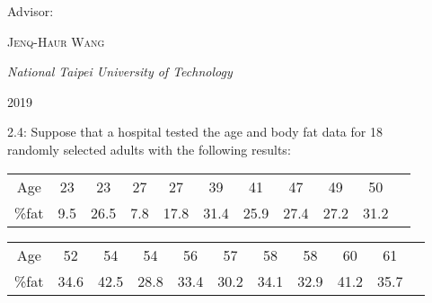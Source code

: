 \begin{titlepage}
	\vspace{0.5\baselineskip} %

	Advisor:

	\vspace{0.5\baselineskip} %
	
	{\scshape\Large Jenq-Haur Wang} %
	
	\vspace{0.5\baselineskip} %
	
	\textit{National Taipei University of Technology} %
	
	\vfill %
	
	
	
	\vspace{0.3\baselineskip} %
	
	2019 %
	

\end{titlepage}


	\clearpage

	2.4: Suppose that a hospital tested the age and body fat data for 18 \\ randomly selected adults with the following results:

	\vspace{0.5\baselineskip}

	\begin{center}
	\begin{tabular}{ |c|c|c|c|c|c|c|c|c|c|c| } 
	\hline

	Age & 23 & 23 & 27 & 27 & 39 & 41 & 47 & 49 & 50 \\ 
	\%fat & 9.5 & 26.5 & 7.8 & 17.8 & 31.4 & 25.9 & 27.4 & 27.2 & 31.2 \\ 

	\hline
	\end{tabular}
	\end{center}

	\vspace{0.5\baselineskip}

	\begin{center}
	\begin{tabular}{ |c|c|c|c|c|c|c|c|c|c|c| } 
	\hline
	
	Age & 52 & 54 & 54 & 56 & 57 & 58 & 58 & 60 & 61 \\ 
	\%fat & 34.6 & 42.5 & 28.8 & 33.4 & 30.2 & 34.1 & 32.9 & 41.2 & 35.7 \\ 
	
	\hline
	\end{tabular}
	\end{center}

